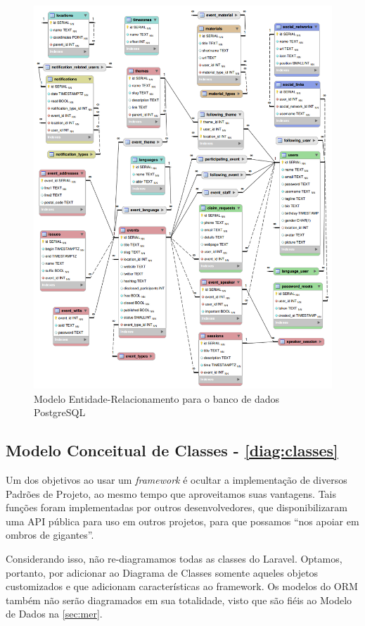 \documentclass[12pt,a4paper,twoside,hyphens,english,brazil]{abntex2}
\begin{document}
{\begin{figure}
\centering
	\includegraphics[width=1\linewidth]{diagramas/modelo-dados.png}
	\caption{Modelo Entidade-Relacionamento para o banco de dados PostgreSQL}
	\label{diag:mer}
\end{figure}

\FloatBarrier
\subsection{Modelo Conceitual de Classes - \autoref{diag:classes}} \label{sec:classes}
Um dos objetivos ao usar um \emph{framework} é ocultar a implementação de diversos Padrões de Projeto, ao mesmo tempo que aproveitamos suas vantagens. Tais funções foram implementadas por outros desenvolvedores, que disponibilizaram uma API pública para uso em outros projetos, para que possamos ``nos apoiar em ombros de gigantes''.

Considerando isso, não re-diagramamos todas as classes do Laravel. Optamos, portanto, por adicionar ao Diagrama de Classes somente aqueles objetos customizados e que adicionam características ao framework. Os modelos do ORM também não serão diagramados em sua totalidade, visto que são fiéis ao Modelo de Dados na \autoref{sec:mer}.

}
\end{document}
